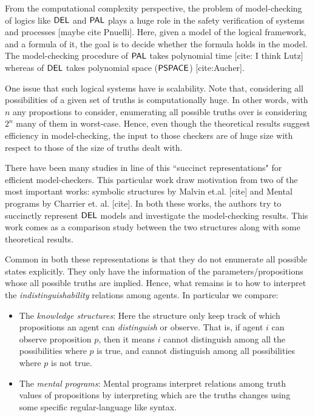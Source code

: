 \documentclass[submission,copyright,creativecommons]{eptcs}
\begin{document}
From the computational complexity perspective, the problem of model-checking of logics like $\mathsf{DEL}$ and $\mathsf{PAL}$ plays a huge role in the safety verification of systems and processes [maybe cite Pnuelli]. Here, given a model of the logical framework, and a formula of it, the goal is to decide whether the formula holds in the model. The model-checking procedure of $\mathsf{PAL}$ takes polynomial time [cite: I think Lutz] whereas of $\mathsf{DEL}$ takes polynomial space ($\mathsf{PSPACE}$) [cite:Aucher].

One issue that such logical systems have is scalability. Note that, considering all possibilities of a given set of truths is computationally huge. In other words, with $n$ any propostions to consider, enumerating all possible truths over is considering $2^n$ many of them in worst-case. Hence, even though the theoretical results suggest efficiency in model-checking, the input to those checkers are of huge size with respect to those of the size of truths dealt with. 

There have been many studies in line of this ``succinct representations" for efficient model-checkers. This particular work draw motivation from two of the most important works: symbolic structures by Malvin et.al. [cite] and Mental programs by Charrier et. al. [cite]. In both these works, the authors try to succinctly represent $\mathsf{DEL}$ models and investigate the model-checking results. This work comes as a comparison study between the two structures along with some theoretical results. 

Common in both these representations is that they do not enumerate all possible states explicitly. They only have the information of the parameters/propositions whose all possible truths are implied. Hence, what remains is to how to interpret the \emph{indistinguishability} relations among agents.
In particular we compare:
\begin{itemize}
    \item The \emph{knowledge structures}: Here the structure only keep track of which propositions an agent can \emph{distinguish} or observe. That is, if agent $i$ can observe proposition $p$, then it means $i$ cannot distinguish among all the possibilities where $p$ is true, and cannot distinguish among all possibilities where $p$ is not true.
    \item The \emph{mental programs}: Mental programs interpret relations among truth values of propositions by interpreting which are the truths changes using some specific regular-language like syntax.
\end{itemize}
\end{document}
